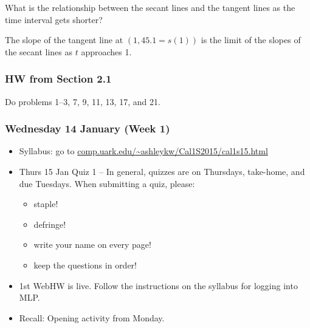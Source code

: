 \documentclass[14pt]{beamer}
\begin{document}
\begin{frame}
\begin{que} What is the relationship between the secant lines and the tangent lines as the time interval gets shorter? \end{que}

\vspace{2pc}
\pause
The slope of the tangent line at $(1, 45.1=s(1))$ is the limit of the slopes of the secant lines as $t$ approaches 1.
\end{frame}

\begin{frame}
\frametitle{HW from Section 2.1}
Do problems 1--3, 7, 9, 11, 13, 17, and 21.
\end{frame}

\begin{frame}
\frametitle{Wednesday 14 January (Week 1)}
\footnotesize
\begin{itemize}
\item Syllabus: go to \url{comp.uark.edu/~ashleykw/Cal1S2015/cal1s15.html}
\item Thurs 15 Jan Quiz 1 -- In general, quizzes are on Thursdays, take-home, and due Tuesdays.  When submitting a quiz, please:
	\begin{itemize}\footnotesize
	\item staple!
	\item defringe!
	\item write your name on every page!
	\item keep the questions in order!
	\end{itemize}
\item 1st WebHW is live.  Follow the instructions on the syllabus for logging into MLP.
\item Recall: Opening activity from Monday.
\end{itemize}
\end{frame}
\end{document}
